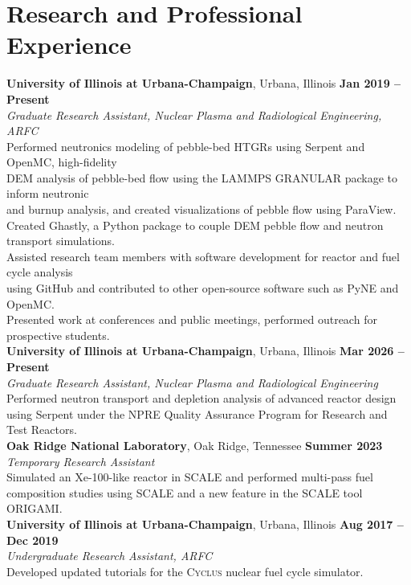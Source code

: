\section{\mysidestyle Research and Professional Experience}

\textbf{University of Illinois at Urbana-Champaign}, Urbana, Illinois \hfill \textbf{Jan 2019 -- Present}\\
\textsl{Graduate Research Assistant, Nuclear Plasma and Radiological Engineering, ARFC}\\
Performed neutronics modeling of pebble-bed HTGRs using Serpent and OpenMC, high-fidelity \\ \hspace*{2 mm}DEM analysis of pebble-bed flow using the LAMMPS GRANULAR package to inform neutronic \\ \hspace*{2 mm}and burnup analysis, and created visualizations of pebble flow using ParaView. \vspace{1 mm}\\
Created Ghastly, a Python package to couple DEM pebble flow and neutron transport simulations. \vspace{1 mm}\\
Assisted research team members with software development for reactor and fuel cycle analysis \\ \hspace*{2 mm}using GitHub and contributed to other open-source software such as PyNE and OpenMC. \vspace{1 mm}\\
Presented work at conferences and public meetings, performed outreach for prospective students.\\



\textbf{University of Illinois at Urbana-Champaign}, Urbana, Illinois \hfill \textbf{Mar 2026 -- Present}\\
\textsl{Graduate Research Assistant, Nuclear Plasma and Radiological Engineering}\\
Performed neutron transport and depletion analysis of advanced reactor design using Serpent under the NPRE Quality Assurance Program for Research and Test Reactors.\\

\textbf{Oak Ridge National Laboratory}, Oak Ridge, Tennessee \hfill \textbf{Summer 2023}\\
\textsl{Temporary Research Assistant}\\
Simulated an Xe-100-like reactor in SCALE and performed multi-pass fuel composition studies using SCALE and a new feature in the SCALE tool ORIGAMI.\\

\textbf{University of Illinois at Urbana-Champaign}, Urbana, Illinois \hfill \textbf{Aug 2017 -- Dec 2019}\\
\textsl{Undergraduate Research Assistant, ARFC}\\
Developed updated tutorials for the \textsc{Cyclus} nuclear fuel cycle simulator.\\
